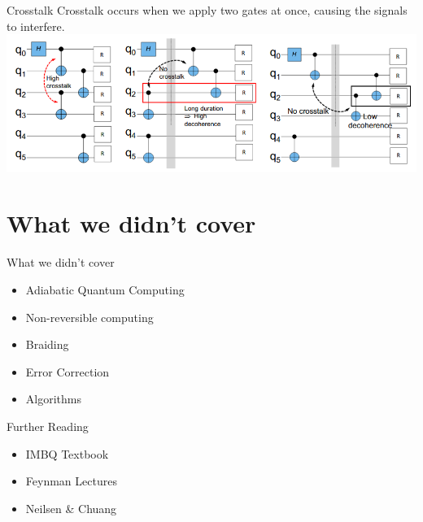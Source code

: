 \documentclass{beamer}
\begin{document}

\begin{frame}{Crosstalk}
    Crosstalk occurs when we apply two gates at once, causing the signals to interfere.
\includegraphics[width=\textwidth]{images/sequence.png}
\end{frame}


\section*{What we didn't cover}

\begin{frame}{What we didn't cover}
    \begin{itemize}
        \item Adiabatic Quantum Computing
        \item Non-reversible computing
        \item Braiding
        \item Error Correction
        \item Algorithms
    \end{itemize}
\end{frame}

\begin{frame}{Further Reading}
    \begin{itemize}
        \item IMBQ Textbook
        \item Feynman Lectures
        \item Neilsen \& Chuang
    \end{itemize}
    
\end{frame}
\end{document}
